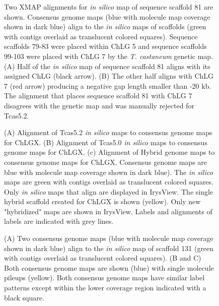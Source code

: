 \documentclass{bmcart}
\begin{document}
\begin{backmatter}
\begin{figure}[h!]
      \end{figure}                      
\begin{figure}[h!]
	\caption{
 Two XMAP alignments for \textit{in silico} map of sequence scaffold 81 are shown. Consensus genome maps (blue with molecule map coverage shown in dark blue) align to the \textit{in silico} maps of scaffolds (green with contigs overlaid as translucent colored squares). Sequence scaffolds 79-83 were placed within ChLG 5 and sequence scaffolds 99-103 were placed with ChLG 7 by the \textit{T. castaneum} genetic map. (A) Half of the \textit{in silico} map of sequence scaffold 81 aligns with its assigned ChLG (black arrow). (B) The other half aligns with ChLG 7 (red arrow) producing a negative gap length smaller than -20 kb. The alignment that places sequence scaffold 81 with ChLG 7 disagrees with the genetic map and was manually rejected for Tcas5.2.}
      \end{figure} 

\begin{figure}[h!]
	\caption{
 (A) Alignment of Tcas5.2 \textit{in silico} maps to consensus genome maps for ChLGX. (B) Alignment of Tcas5.0 \textit{in silico} maps to consensus genome maps for ChLGX. (c) Alignment of Hybrid genome maps to consensus genome maps for ChLGX. Consensus genome maps are blue with molecule map coverage shown in dark blue). The \textit{in silico} maps are green with contigs overlaid as translucent colored squares. Only \textit{in silico} maps that align are displayed in IrysView. The single hybrid scaffold created for ChLGX is shown (yellow). Only new "hybridized" maps are shown in IrysView. Labels and alignments of labels are indicated with grey lines. }
      \end{figure}  
\begin{figure}[h!]
	\caption{
 (A) Two consensus genome maps (blue with molecule map coverage shown in dark blue) align to the \textit{in silico} map of scaffold 131 (green with contigs overlaid as translucent colored squares). (B and C) Both consensus genome maps are shown (blue) with single molecule pileups (yellow). Both consensus genome maps have similar label patterns except within the lower coverage region indicated with a black square.}
\end{figure}            



\end{backmatter}
\end{document}
